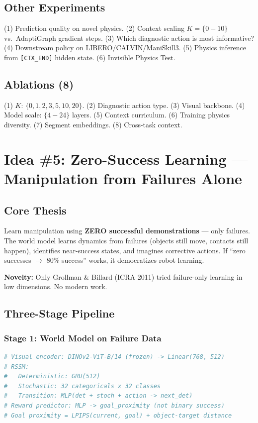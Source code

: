 \documentclass[11pt,a4paper]{article}
\begin{document}
\subsection{Other Experiments}
(1) Prediction quality on novel physics. (2) Context scaling $K{=}\{0{-}10\}$ vs.\ AdaptiGraph gradient steps. (3) Which diagnostic action is most informative? (4) Downstream policy on LIBERO/CALVIN/ManiSkill3. (5) Physics inference from \texttt{[CTX\_END]} hidden state. (6) Invisible Physics Test.

\subsection{Ablations (8)}
(1) $K$: $\{0,1,2,3,5,10,20\}$. (2) Diagnostic action type. (3) Visual backbone. (4) Model scale: $\{4{-}24\}$ layers. (5) Context curriculum. (6) Training physics diversity. (7) Segment embeddings. (8) Cross-task context.

\newpage
\section{Idea \#5: Zero-Success Learning --- Manipulation from Failures Alone}
\label{sec:zerosuccess}

\subsection{Core Thesis}

Learn manipulation using \textbf{ZERO successful demonstrations} --- only failures. The world model learns dynamics from failures (objects still move, contacts still happen), identifies near-success states, and imagines corrective actions. If ``zero successes $\to$ 80\% success'' works, it democratizes robot learning.

\textbf{Novelty:} Only Grollman \& Billard (ICRA 2011) tried failure-only learning in low dimensions. No modern work.

\subsection{Three-Stage Pipeline}

\subsubsection{Stage 1: World Model on Failure Data}
\begin{lstlisting}[language=Python, caption=RSSM World Model (Dreamer-v3 style)]
# Visual encoder: DINOv2-ViT-B/14 (frozen) -> Linear(768, 512)
# RSSM:
#   Deterministic: GRU(512)
#   Stochastic: 32 categoricals x 32 classes
#   Transition: MLP(det + stoch + action -> next_det)
# Reward predictor: MLP -> goal_proximity (not binary success)
# Goal proximity = LPIPS(current, goal) + object-target distance
\end{lstlisting}
\end{document}

